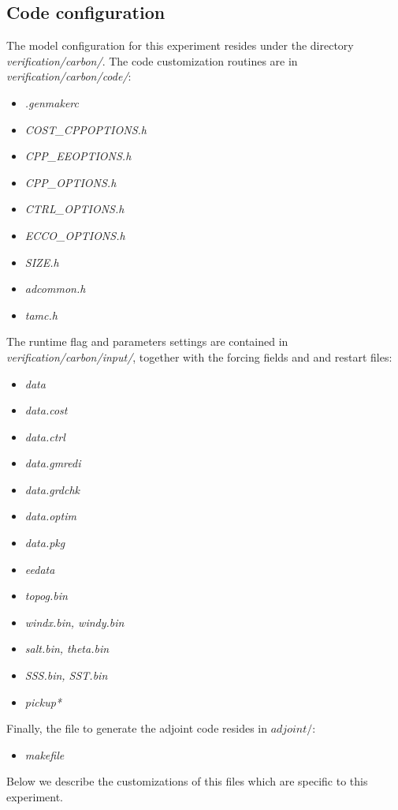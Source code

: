 \subsection{Code configuration}
\label{www:tutorials}

The model configuration for this experiment resides under the
directory {\it verification/carbon/}.
The code customization routines are in {\it verification/carbon/code/}:
%
\begin{itemize}
%
\item {\it .genmakerc}
%
\item {\it COST\_CPPOPTIONS.h}
%
\item {\it CPP\_EEOPTIONS.h}
%
\item {\it CPP\_OPTIONS.h}
%
\item {\it CTRL\_OPTIONS.h}
%
\item {\it ECCO\_OPTIONS.h}
%
\item {\it SIZE.h}
%
\item {\it adcommon.h}
%
\item {\it tamc.h}
%
\end{itemize}
%
The runtime flag and parameters settings are contained in 
{\it verification/carbon/input/},
together with the forcing fields and and restart files:
%
\begin{itemize}
%
\item {\it data}
%
\item {\it data.cost}
%
\item {\it data.ctrl}
%
\item {\it data.gmredi}
%
\item {\it data.grdchk}
%
\item {\it data.optim}
%
\item {\it data.pkg}
%
\item {\it eedata}
%
\item {\it topog.bin}
%
\item {\it windx.bin, windy.bin}
%
\item {\it salt.bin, theta.bin}
%
\item {\it SSS.bin, SST.bin}
%
\item {\it pickup*}
%
\end{itemize}
%
Finally, the file to generate the adjoint code resides in
$ adjoint/ $:
%
\begin{itemize}
%
\item {\it makefile}
%
\end{itemize}
%

Below we describe the customizations of this files which are
specific to this experiment.

